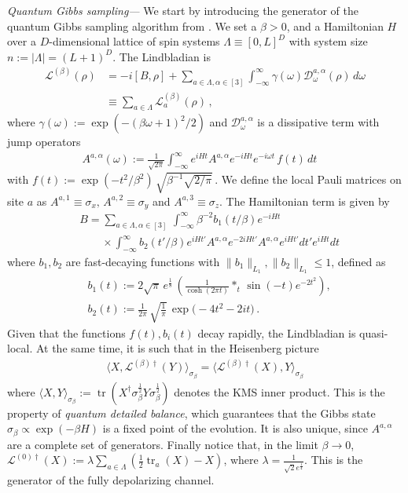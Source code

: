 \documentclass[aps,pra,amsmath,amssymb,twocolumn,10pt]{revtex4-2}
\theoremstyle{definition}
\begin{document}
\emph{Quantum Gibbs sampling—} We start by introducing the generator of the quantum Gibbs sampling algorithm from \cite{chen2023efficient}. We set a $\beta>0$, and a Hamiltonian $H$ over a $D$-dimensional lattice of spin systems $\Lambda\equiv [0,L]^D$ with system size $n:=|\Lambda|=(L+1)^D$. The Lindbladian is
\begin{align}\label{eq:generator1}
\mathcal{L}^{(\beta)}(\rho)&=-i[B,\rho]+\sum_{a\in \Lambda,\alpha\in[3]}\int_{-\infty}^{\infty}\gamma(\omega)\mathcal{D}^{a,\alpha}_\omega(\rho)\,d\omega\\
&\equiv \sum_{a\in\Lambda}\mathcal{L}_a^{(\beta)}(\rho)\nonumber\,,
\end{align}
where $\gamma(\omega):=\operatorname{exp}(-{(\beta\omega+1)^2}/{2})$ and $\mathcal{D}^{a,\alpha}_\omega$ is a dissipative term with jump operators
\begin{align*}
A^{a,\alpha}(\omega):=\frac{1}{\sqrt{2\pi}}\int_{-\infty}^{\infty} e^{iHt}A^{a,\alpha} e^{-iH t}e^{-i\omega t}\,f(t)\,dt\quad 
\end{align*}
with  $f(t):=\operatorname{exp}(-{t^2}/{\beta^2})\,\sqrt{\beta^{-1}\sqrt{2/\pi}}\,$.
We define the local Pauli matrices on site $a$ as $A^{a,1}\equiv \sigma_x,\,A^{a,2}\equiv \sigma_y$ and $A^{a,3}\equiv \sigma_z$. The Hamiltonian term is given by
\begin{align*}
&B=\sum_{a\in \Lambda,\alpha\in [3]}\, \int_{-\infty}^\infty \beta^{-2}b_1(t/\beta) e^{-i Ht}  \\
&\qquad \times\int_{-\infty}^\infty b_2(t'/\beta) e^{iHt'}A^{a,\alpha} e^{-2i Ht'}A^{a,\alpha} e^{i Ht'}dt' e^{i Ht}dt
\end{align*}
where $b_1,b_2$ are fast-decaying functions with $\|b_1\|_{L_1}, \|b_2\|_{L_1}\le 1$, defined as
\begin{align}\label{eq:b1b2}
&b_1(t):= 2\sqrt{\pi}\, e^{\frac{1}{8}}\, \left(\frac{1}{\operatorname{cosh}(2\pi t)}\ast_t\,\sin(-t)e^{-2t^2}\right),\\
&b_2(t):=\frac{1}{2\pi}\,\sqrt{\frac{1}{\pi}}\,\operatorname{exp}\big(-4t^2-2it\big)\,.
\end{align}
Given that the functions $f(t),b_i(t)$ decay rapidly, the Lindbladian is quasi-local. At the same time, it is such that in the Heisenberg picture
\begin{align*}
\langle X,\mathcal{L}^{(\beta)\dagger}(Y)\rangle_{\sigma_\beta}=\langle \mathcal{L}^{(\beta)\dagger}(X),Y\rangle_{\sigma_\beta}
\end{align*}
where $\langle X,Y\rangle_{\sigma_\beta}:=\operatorname{tr}(X^\dagger\sigma_\beta^{\frac{1}{2}}Y\sigma_\beta^{\frac{1}{2}})$ denotes the KMS inner product. This is the property of \emph{quantum detailed balance}, which guarantees that the Gibbs state $\sigma_\beta\propto {\operatorname{exp}(-\beta H)}$ is a fixed point of the evolution. It is also unique, since $A^{a,\alpha}$ are a complete set of generators.
Finally notice that, in the limit $\beta \rightarrow 0$,
$\mathcal{L}^{(0)\dagger}(X):=\lambda \sum_{a\in \Lambda}\left( \frac{1}{2}\operatorname{tr}_a(X)-X\right)$,
where $\lambda=\frac{1}{\sqrt{2}e^{\frac{1}{4}}}$. This is the generator of the fully depolarizing channel.
\end{document}
